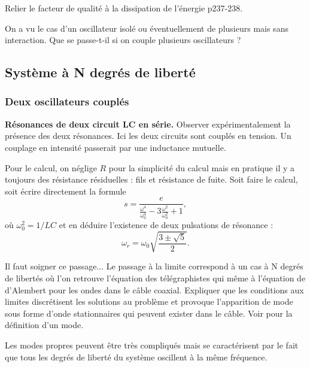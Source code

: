 Relier le facteur de qualité à la dissipation de l'énergie \cite{Faroux1996} p237-238.

\begin{transition}
On a vu le cas d'un oscillateur isolé ou éventuellement de plusieurs mais sans interaction.
Que se passe-t-il si on couple plusieurs oscillateurs ?
\end{transition}

\subsection{Système à N degrés de liberté}

\subsubsection{Deux oscillateurs couplés}

\begin{experience}
\textbf{Résonances de deux circuit LC en série.}
Observer expérimentalement la présence des deux résonances.
Ici les deux circuits sont couplés en tension.
Un couplage en intensité passerait par une inductance mutuelle.
\end{experience}

Pour le calcul, on néglige $R$ pour la simplicité du calcul mais en pratique il y a toujours des résistance résiduelles : fils et résistance de fuite.
Soit faire le calcul, soit écrire directement la formule 
\begin{equation}
s = \frac{e}{\frac{\omega^4}{\omega_0^4} - 3\frac{\omega^2}{\omega_0^2} + 1},
\end{equation}
où $\omega_0^2=1/LC$ et en déduire l'existence de deux pulsations de résonance :
\begin{equation}
\omega_r = \omega_0 \sqrt{\frac{3\pm\sqrt{5}}{2}}.
\end{equation}

Il faut soigner ce passage...
Le passage à la limite correspond à un cas à N degrés de libertés où l'on retrouve l'équation des télégraphistes qui même à l'équation de d'Alembert pour les ondes dans le câble coaxial.
Expliquer que les conditions aux limites discrétisent les solutions au problème et provoque l'apparition de mode sous forme d'onde stationnaires qui peuvent exister dans le câble.
Voir \cite{Taillet2018} pour la définition d'un mode.

\begin{remarque}
Les modes propres peuvent être très compliqués mais se caractérisent par le fait que tous les degrés de liberté du système oscillent à la même fréquence.
\end{remarque}

